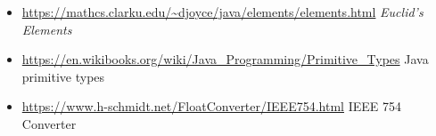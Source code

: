 \documentclass[11pt]{article}%
\begin{document}
\begin{multicols}{2}
\begin{itemize}
\item \url{https://mathcs.clarku.edu/~djoyce/java/elements/elements.html} \textit{Euclid's Elements}

\item \url{https://en.wikibooks.org/wiki/Java_Programming/Primitive_Types} Java primitive types

\item \url{https://www.h-schmidt.net/FloatConverter/IEEE754.html} IEEE 754 Converter



\end{itemize}

\end{multicols}


\printindex %
\end{document}
